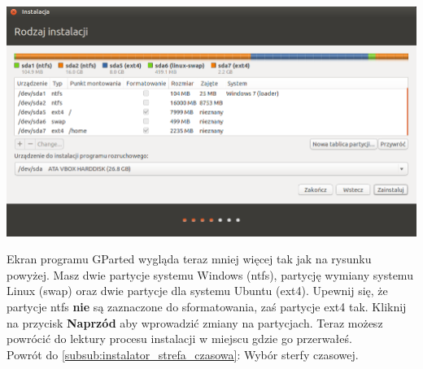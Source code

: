 \begin{center}
	\includegraphics[scale=0.7]{images/instalator_partycjonowanie_gparted4.png}
\end{center}
Ekran programu GParted wygląda teraz mniej więcej tak jak na rysunku powyżej. Masz dwie partycje systemu Windows (ntfs), partycję wymiany systemu Linux (swap) oraz dwie partycje dla systemu Ubuntu (ext4). Upewnij się, że partycje ntfs \textbf{nie} są zaznaczone do sformatowania, zaś partycje ext4 tak. Kliknij na przycisk \textbf{Naprzód} aby wprowadzić zmiany na partycjach. Teraz możesz powrócić do lektury procesu instalacji w miejscu gdzie go przerwałeś.\\
Powrót do \ref{subsub:instalator_strefa_czasowa}: Wybór sterfy czasowej.